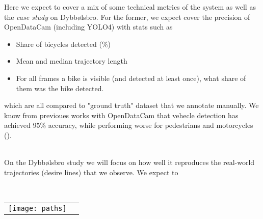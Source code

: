 Here we expect to cover a mix of some technical metrics of the system as well as the \textit{case study} on Dybbølsbro. 
For the former, we expect cover the precision of OpenDataCam (including YOLO4) with stats such as

\begin{itemize}
	\item Share of bicycles detected (\%)
	\item Mean and median trajectory length
	\item For all frames a bike is visible (and detected at least once), what share of them was the bike detected.
\end{itemize}

which are all compared to "ground truth" dataset that we annotate manually. We know from previoues works with OpenDataCam
that vehecle detection has achieved 95\% accuracy, while performing worse for pedestrians and motorcycles (\cite{BROEKMAN2021100068}).

\ \\
On the Dybbølsbro study we will focus on how well it reproduces the real-world trajectories (desire lines) that
we observe. We expect to 


\raggedbottom
\ \\ 
\noindent
\begin{tabular}{@{}cc}
\texttt{[image: paths]} 
\end{tabular}
